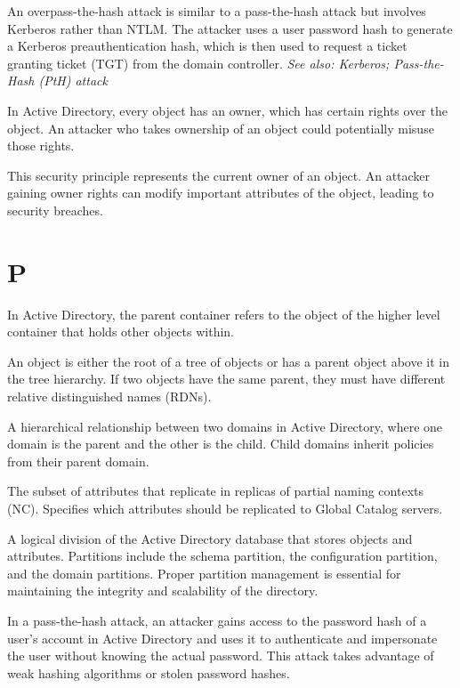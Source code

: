  An overpass-the-hash attack is similar to a pass-the-hash attack but involves Kerberos rather than NTLM. The attacker uses a user password hash to generate a Kerberos preauthentication hash, which is then used to request a ticket granting ticket (TGT) from the domain controller.
\textit{See also: Kerberos; Pass-the-Hash (PtH) attack}

 In Active Directory, every object has an owner, which has certain rights over the object. An attacker who takes ownership of an object could potentially misuse those rights.

 This security principle represents the current owner of an object. An attacker gaining owner rights can modify important attributes of the object, leading to security breaches.

\section*{P}
 In Active Directory, the parent container refers to the object of the higher level container that holds other objects within.

 An object is either the root of a tree of objects or has a parent object above it in the tree hierarchy. If two objects have the same parent, they must have different relative distinguished names (RDNs).

 A hierarchical relationship between two domains in Active Directory, where one domain is the parent and the other is the child. Child domains inherit policies from their parent domain.

 The subset of attributes that replicate in replicas of partial naming contexts (NC). Specifies which attributes should be replicated to Global Catalog servers.

 A logical division of the Active Directory database that stores objects and attributes. Partitions include the schema partition, the configuration partition, and the domain partitions. Proper partition management is essential for maintaining the integrity and scalability of the directory.

 In a pass-the-hash attack, an attacker gains access to the password hash of a user’s account in Active Directory and uses it to authenticate and impersonate the user without knowing the actual password. This attack takes advantage of weak hashing algorithms or stolen password hashes.

